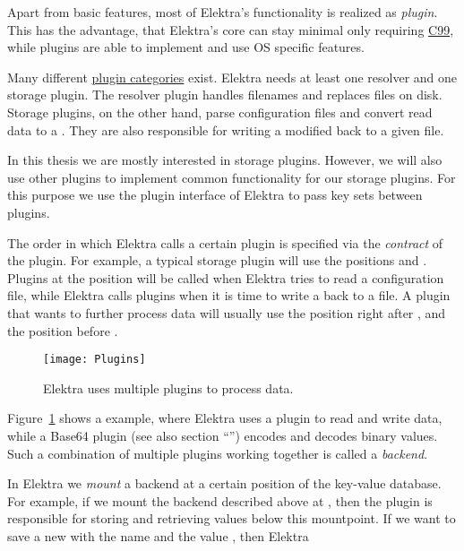 Apart from basic features, most of Elektra’s functionality is realized as \emph{plugin}. This has the advantage, that Elektra’s core can stay minimal only requiring \href{https://en.wikipedia.org/wiki/C99}{C99}, while plugins are able to implement and use OS specific features.

Many different \href{https://www.libelektra.org/plugins}{plugin categories} exist. Elektra needs at least one resolver and one storage plugin. The resolver plugin handles filenames and replaces files on disk. Storage plugins, on the other hand, parse configuration files and convert read data to a . They are also responsible for writing a modified  back to a given file.

In this thesis we are mostly interested in storage plugins. However, we will also use other plugins to implement common functionality for our  storage plugins. For this purpose we use the plugin interface of Elektra to pass key sets between plugins.

The order in which Elektra calls a certain plugin is specified via the \emph{contract} of the plugin. For example, a typical storage plugin will use the positions  and . Plugins at the position  will be called when Elektra tries to read a configuration file, while Elektra calls  plugins when it is time to write a  back to a file. A plugin that wants to further process data will usually use the position  right after , and  the position before .

\begin{figure}
  \centering
    \texttt{[image: Plugins]}
  \caption{Elektra uses multiple plugins to process data.}
  \label{fig:plugins}
\end{figure}

Figure~\ref{fig:plugins} shows a example, where Elektra uses a  plugin to read and write data, while a Base64 plugin (see also section “”) encodes and decodes binary values. Such a combination of multiple plugins working together is called a \emph{backend}.

In Elektra we \emph{mount} a backend at a certain position of the key-value database. For example, if we mount the backend described above at , then the  plugin is responsible for storing and retrieving values below this mountpoint. If we want to save a new  with the name  and the value , then Elektra

